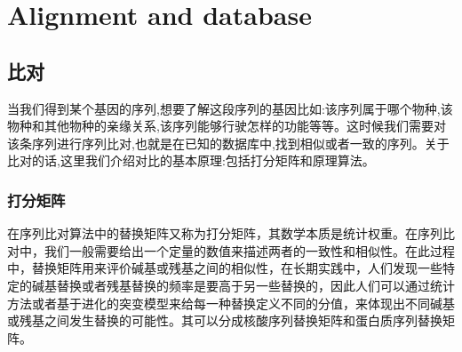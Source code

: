 \chapter{Alignment and database}
\section {比对}
当我们得到某个基因的序列,想要了解这段序列的基因比如:该序列属于哪个物种,该物种和其他物种的亲缘关系,该序列能够行驶怎样的功能等等。这时候我们需要对该条序列进行序列比对,也就是在已知的数据库中,找到相似或者一致的序列。关于比对的话,这里我们介绍对比的基本原理:包括打分矩阵和原理算法。
\subsection {打分矩阵}
在序列比对算法中的替换矩阵又称为打分矩阵，其数学本质是统计权重。在序列比对中，我们一般需要给出一个定量的数值来描述两者的一致性和相似性。在此过程中，替换矩阵用来评价碱基或残基之间的相似性，在长期实践中，人们发现一些特定的碱基替换或者残基替换的频率是要高于另一些替换的，因此人们可以通过统计方法或者基于进化的突变模型来给每一种替换定义不同的分值，来体现出不同碱基或残基之间发生替换的可能性。其可以分成核酸序列替换矩阵和蛋白质序列替换矩阵。

